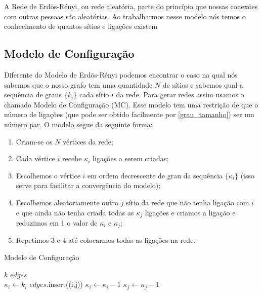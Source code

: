 \documentclass[12pt]{abnt-fisica11}%
\begin{document}
A Rede de Erdös-Rényi, ou rede aleatória, parte do princípio que nossas conexões com outras pessoas são aleatórias. Ao trabalharmos nesse modelo nós temos o conhecimento de quantos sítios e ligações existem

\subsection{Modelo de Configuração}

Diferente do Modelo de Erdös-Rényi podemos encontrar o caso na qual nós sabemos que o nosso grafo tem uma quantidade $N$ de sítios e sabemos qual a sequência de graus $\{k_i\}$ cada sítio $i$ da rede. Para gerar redes assim usamos o chamado Modelo de Configuração (MC). Esse modelo tem uma restrição de que o número de ligações (que pode ser obtido facilmente por \ref{grau_tamanho}) ser um número par. O modelo segue da seguinte forma:

\begin{enumerate}
  \item Criam-se os $N$ vértices da rede;
  \item Cada vértice $i$ recebe $\kappa_i$ ligações a serem criadas;
  \item Escolhemos o vértice $i$ em ordem decrescente de grau da sequência $\{\kappa_i\}$ (isso serve para facilitar a convergência do modelo);
  \item Escolhemos aleatoriamente outro $j$ sítio da rede que não tenha ligação com $i$ e que ainda não tenha criada todas as $\kappa_j$ ligações e criamos a ligação e reduzimos em 1 o valor de $\kappa_i$ e $\kappa_j$;
  \item Repetimos 3 e 4 até colocarmos todas as ligações na rede.
\end{enumerate}

\begin{algorithm}

  \caption{Modelo de Configuração}\label{alg:MC}
  \begin{algorithmic}
  \Require $k$ 
  \Require $edges$\\

   
    \State $\kappa_i \gets k_i$
            \State $edges$.insert((i,j))
            \State $\kappa_i \gets \kappa_i - 1$
            \State $\kappa_j \gets \kappa_j - 1$
          \EndIf
      \EndIf
    \EndWhile
  \EndWhile
  \end{algorithmic}

\end{algorithm}
\end{document}
